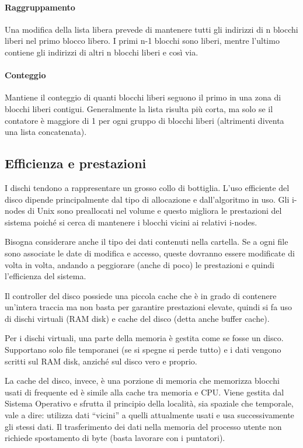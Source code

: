 \documentclass[a4paper]{article}
\begin{document}
\paragraph{Raggruppamento}
Una modifica della lista libera prevede di mantenere tutti gli indirizzi di n blocchi liberi nel primo blocco libero. I primi n-1 blocchi sono liberi, mentre l'ultimo contiene gli indirizzi di altri n blocchi liberi e così via.

\paragraph{Conteggio}
Mantiene il conteggio di quanti blocchi liberi seguono il primo in una zona di blocchi liberi contigui. Generalmente la lista risulta più corta, ma solo se il contatore è maggiore di 1 per ogni gruppo di blocchi liberi (altrimenti diventa una lista concatenata).

\subsection{Efficienza e prestazioni}
I dischi tendono a rappresentare un grosso collo di bottiglia. L'uso efficiente del disco dipende principalmente dal tipo di allocazione e dall'algoritmo in uso. Gli i-nodes di Unix sono preallocati nel volume e questo migliora le prestazioni del sistema poiché si cerca di mantenere i blocchi vicini ai relativi i-nodes.

Bisogna considerare anche il tipo dei dati contenuti nella cartella. Se a ogni file sono associate le date di modifica e accesso, queste dovranno essere modificate di volta in volta, andando a peggiorare (anche di poco) le prestazioni e quindi l'efficienza del sistema.

Il controller del disco possiede una piccola cache che è in grado di contenere un'intera traccia ma non basta per garantire prestazioni elevate, quindi si fa uso di dischi virtuali (RAM disk) e cache del disco (detta anche buffer cache).

Per i dischi virtuali, una parte della memoria è gestita come se fosse un disco. Supportano solo file temporanei (se si spegne si perde tutto) e i dati vengono scritti sul RAM disk, anziché sul disco vero e proprio.

La cache del disco, invece, è una porzione di memoria che memorizza blocchi usati di frequente ed è simile alla cache tra memoria e CPU. Viene gestita dal Sistema Operativo e sfrutta il principio della località, sia spaziale che temporale, vale a dire: utilizza dati ``vicini'' a quelli attualmente usati e usa successivamente gli stessi dati. \newline
Il trasferimento dei dati nella memoria del processo utente non richiede spostamento di byte (basta lavorare con i puntatori).
\end{document}
